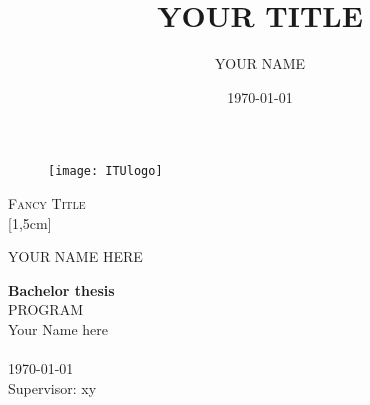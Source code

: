 
\title{YOUR TITLE}
\author{YOUR NAME}
\date{\today} %

\begin{titlepage}
\thispagestyle{empty}
\begin{figure}[h!] %
\centering
\texttt{[image: ITUlogo]} 
\end{figure}

\begin{center}
\vspace{30 mm}
\begingroup \linespread{1,75} \selectfont 
\textsc{\LARGE Fancy Title}\\
[1,5cm]
\endgroup

YOUR NAME HERE\\[2,5cm]

\end{center}
\vfill
\textbf{Bachelor thesis}\\ %
PROGRAM\\   %
Your Name here\\
\\
\today\\
Supervisor: xy
\end{titlepage}

